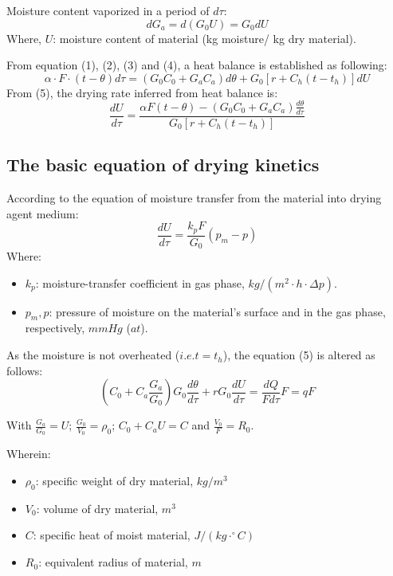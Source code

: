 Moisture content vaporized in a period of $d\tau$:
\begin{equation}
    dG_a = d(G_0U) = G_0dU
\end{equation}
Where, $U$: moisture content of material (kg moisture/ kg dry material).

From equation (1), (2), (3) and (4), a heat balance is established as following:
\begin{equation}
    \alpha \cdot F \cdot (t - \theta) d\tau = (G_0C_0 + G_aC_a) d\theta + G_0[r + C_h(t - t_h)] dU
\end{equation}
From (5), the drying rate inferred from heat balance is:
\begin{equation}
    \frac{dU}{d\tau} = \frac{\alpha F(t - \theta) - (G_0C_0 + G_aC_a)\frac{d\theta}{d\tau}}{G_0[r + C_h(t - t_h)]}
\end{equation}

\subsection{The basic equation of drying kinetics}
According to the equation of moisture transfer from the material into drying agent medium:
\begin{equation}
    \frac{dU}{d\tau} = \frac{k_p F}{G_0}(p_m - p)
\end{equation}
Where:
\begin{itemize}
    \item $k_p$: moisture-transfer coefficient in gas phase, $kg/(m^2 \cdot h \cdot \Delta p)$.
    \item $p_m, p$: pressure of moisture on the material's surface and in the gas phase, respectively, $mmHg$ ($at$).
\end{itemize}

As the moisture is not overheated ($i.e. t = t_h$), the equation (5) is altered as follows:
\begin{equation}
    \left(C_0 + C_a \frac{G_a}{G_0}\right) G_0 \frac{d\theta}{d\tau} + r G_0 \frac{dU}{d\tau} = \frac{dQ}{F d\tau}F = qF
\end{equation}

With $\frac{G_a}{G_0} = U$; $\frac{G_0}{V_0} = \rho_0$; $C_0 + C_a U = C$ and $\frac{V_0}{F} = R_0$.

Wherein:
\begin{itemize}
    \item $\rho_0$: specific weight of dry material, $kg/m^3$
    \item $V_0$: volume of dry material, $m^3$
    \item $C$: specific heat of moist material, $J/(kg \cdot ^\circ C)$
    \item $R_0$: equivalent radius of material, $m$
\end{itemize}

